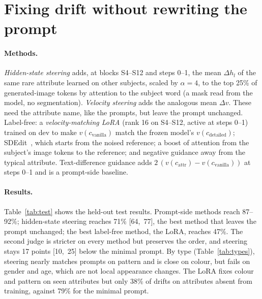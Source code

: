 \documentclass[10pt,twocolumn]{article}
\newcommand{\dv}{\Delta v}
\newcommand{\dH}{\Delta h}
\begin{document}
\section{Fixing drift without rewriting the prompt}
\paragraph{Methods.} \emph{Hidden-state steering} adds, at blocks S4--S12 and steps 0--1, the mean $\dH_l$ of the same rare
attribute learned on other subjects, scaled by $\alpha=4$, to the top 25\% of generated-image tokens by attention to the
subject word (a mask read from the model, no segmentation). \emph{Velocity steering} adds the analogous mean $\dv$. These need
the attribute name, like the prompts, but leave the prompt unchanged. Label-free: a \emph{velocity-matching LoRA} (rank 16 on
S4--S12, active at steps 0--1) trained on dev to make $v(c_\text{vanilla})$ match the frozen model's $v(c_\text{detailed})$;
SDEdit~\citep{sdedit}, which starts from the noised reference; a boost of attention from the subject's image tokens to the
reference; and negative guidance away from the typical attribute. Text-difference guidance adds
$2\,(v(c_\text{attr})-v(c_\text{vanilla}))$ at steps 0--1 and is a prompt-side baseline.

\begin{table}[t]
\centering\small

\caption{\textbf{Held-out test}: 233 drifting rare-view cases from 70 subjects not used for any choice. Label: whether the
method needs the rare attribute (``typical'': needs the typical one). Passes: extra transformer passes at the steered steps.
Kept, Edited, Defect: \% of cases by judge 1. Clean: all three; Judge 2: clean under the second judge, rescoring the same
images (``--'': not rescored).}
\label{tab:test}
\end{table}

\paragraph{Results.} Table~\ref{tab:test} shows the held-out test results. Prompt-side methods reach 87--92\%; hidden-state steering reaches 71\%
[64,~77], the best method that leaves the prompt unchanged; the best label-free method, the LoRA, reaches 47\%. The second judge
is stricter on every method but preserves the order, and steering stays 17 points [10,~25] below the minimal prompt. By type
(Table~\ref{tab:types}), steering nearly matches prompts on pattern and is close on colour, but fails on gender and age, which
are not local appearance changes. The LoRA fixes colour and pattern on seen attributes but only 38\% of drifts on
attributes absent from training, against 79\% for the minimal prompt.
\end{document}
